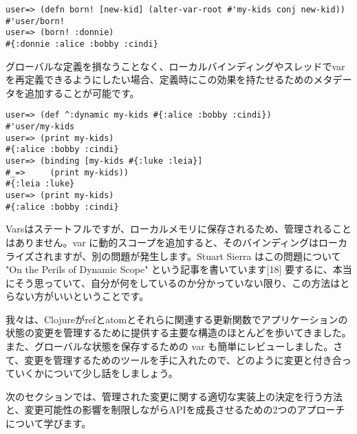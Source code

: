 \begin{lstlisting}[numbers=none]
user=> (defn born! [new-kid] (alter-var-root #'my-kids conj new-kid))
#'user/born!
user=> (born! :donnie)
#{:donnie :alice :bobby :cindi}
\end{lstlisting}

グローバルな定義を損なうことなく、ローカルバインディングやスレッドでvarを再定義できるようにしたい場合、定義時にこの効果を持たせるためのメタデータを追加することが可能です。


\begin{lstlisting}[numbers=none]
user=> (def ^:dynamic my-kids #{:alice :bobby :cindi})
#'user/my-kids
user=> (print my-kids)
#{:alice :bobby :cindi}
user=> (binding [my-kids #{:luke :leia}]
#_=>     (print my-kids))
#{:leia :luke}
user=> (print my-kids)
#{:alice :bobby :cindi}
\end{lstlisting}

Varsはステートフルですが、ローカルメモリに保存されるため、管理されることはありません。var に動的スコープを追加すると、そのバインディングはローカライズされますが、別の問題が発生します。Stuart Sierra はこの問題について "On the Perils of Dynamic Scope" という記事を書いています[18] 要するに、本当にそう思っていて、自分が何をしているのか分かっていない限り、この方法はとらない方がいいということです。

我々は、Clojureがrefとatomとそれらに関連する更新関数でアプリケーションの状態の変更を管理するために提供する主要な構造のほとんどを歩いてきました。また、グローバルな状態を保存するための var も簡単にレビューしました。さて、変更を管理するためのツールを手に入れたので、どのように変更と付き合っていくかについて少し話をしましょう。

次のセクションでは、管理された変更に関する適切な実装上の決定を行う方法と、変更可能性の影響を制限しながらAPIを成長させるための2つのアプローチについて学びます。